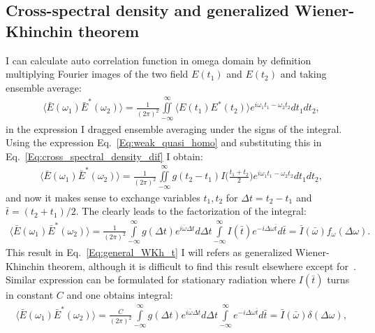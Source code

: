 \subsection{Cross-spectral density and generalized Wiener-Khinchin theorem}
    I can calculate auto correlation function in omega domain by definition multiplying Fourier images of the two field  $E(t_1)$ and $E(t_2)$ and taking ensemble average:
    \begin{align}
        \langle \bar{E}(\omega_1)\bar{E}^*(\omega_2) \rangle = \frac{1}{(2 \pi)^2} \iint \limits_{-\infty}^{\infty} \langle E(t_1)E^*(t_2) \rangle e^{i \omega_1 t_1 - \omega_2 t_2} dt_1 dt_2, 
        \label{Eq:cross_spectral_density_dif}
    \end{align}
    in the expression I dragged ensemble averaging under the signs of the integral. Using the expression Eq.~\ref{Eq:weak_quasi_homo} and substituting this in Eq.~\ref{Eq:cross_spectral_density_dif} I obtain:
    \begin{align}
        \langle \bar{E}(\omega_1)\bar{E}^*(\omega_2) \rangle = \frac{1}{(2 \pi)^2} \iint \limits_{-\infty}^{\infty}  g(t_2 - t_1)I\bigg(\frac{t_1 + t_2}{2}\bigg) e^{i \omega_1 t_1 - \omega_2 t_2} dt_1 dt_2, 
    \end{align}
    and now it makes sense to exchange variables $t_1, t_2$ for $\Delta t = t_2 - t_1$ and $\bar{t} = (t_2 + t_1)/2$. The clearly leads to the factorization of the integral:
    \begin{align}
        \langle \bar{E}(\omega_1)\bar{E}^*(\omega_2) \rangle = \frac{1}{(2 \pi)^2} \int \limits_{-\infty}^{\infty}  g(\Delta t) e^{i \bar{\omega} \Delta t} d \Delta t  \int \limits_{-\infty}^{\infty} I(\bar{t}) e^{-i \Delta \omega \bar{t}} d\bar{t} = \bar{I}(\bar{\omega})f_{\omega}(\Delta \omega).
        \label{Eq:general_WKh_t}
    \end{align}
    This result in Eq.~\ref{Eq:general_WKh_t} I will refers as generalized Wiener-Khinchin theorem, although it is difficult to find this result elsewhere except for~\cite{geloni_statistical_2006}. Similar expression can be formulated for stationary radiation where $I(\bar{t})$ turns in constant $C$ and one obtains integral:
    \begin{align}
        \langle \bar{E}(\omega_1)\bar{E}^*(\omega_2) \rangle = \frac{C}{(2 \pi)^2} \int \limits_{-\infty}^{\infty}  g(\Delta t) e^{i \bar{\omega} \Delta t} d \Delta t  \int \limits_{-\infty}^{\infty} e^{-i \Delta \omega \bar{t}} d\bar{t} = \bar{I}(\bar{\omega})\delta(\Delta \omega),
        \label{Eq:WKh_t_derivation}
    \end{align}
